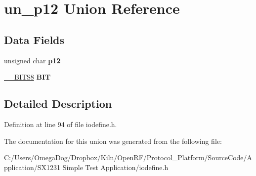 \hypertarget{unionun__p12}{\section{un\-\_\-p12 Union Reference}
\label{unionun__p12}
}
\subsection*{Data Fields}
\begin{DoxyCompactItemize}
\item 
\hypertarget{unionun__p12_a0ba9cb236e3555799a6456304be1e838}{unsigned char {\bfseries p12}}\label{unionun__p12_a0ba9cb236e3555799a6456304be1e838}

\item 
\hypertarget{unionun__p12_a6918ef252b9b0a82ae68485e0b7ad358}{\hyperlink{struct_____b_i_t_s8}{\-\_\-\-\_\-\-B\-I\-T\-S8} {\bfseries B\-I\-T}}\label{unionun__p12_a6918ef252b9b0a82ae68485e0b7ad358}

\end{DoxyCompactItemize}


\subsection{Detailed Description}


Definition at line 94 of file iodefine.\-h.



The documentation for this union was generated from the following file\-:\begin{DoxyCompactItemize}
\item 
C\-:/\-Users/\-Omega\-Dog/\-Dropbox/\-Kiln/\-Open\-R\-F/\-Protocol\-\_\-\-Platform/\-Source\-Code/\-Application/\-S\-X1231 Simple Test Application/iodefine.\-h\end{DoxyCompactItemize}
